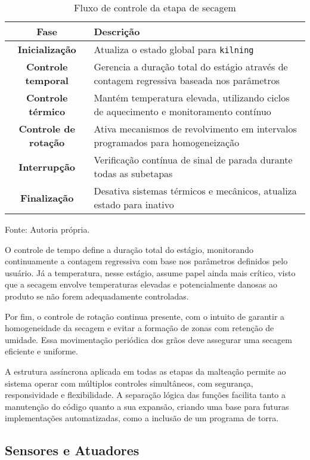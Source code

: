 \begin{table}[ht]
    \caption{Fluxo de controle da etapa de secagem}
    \label{tab:secagem_fluxo}
    \centering
    \begin{tabular}{>{\bfseries}c p{10cm}}
        \hline
        Fase & Descrição \\
        \hline
        Inicialização & Atualiza o estado global para \texttt{kilning} \\
        Controle temporal & Gerencia a duração total do estágio através de contagem regressiva baseada nos parâmetros \\
        Controle térmico & Mantém temperatura elevada, utilizando ciclos de aquecimento e monitoramento contínuo \\
        Controle de rotação & Ativa mecanismos de revolvimento em intervalos programados para homogeneização \\
        Interrupção & Verificação contínua de sinal de parada durante todas as subetapas \\
        Finalização & Desativa sistemas térmicos e mecânicos, atualiza estado para inativo \\
        \hline
    \end{tabular}

    {\centering\footnotesize Fonte: Autoria própria.\par}
\end{table}

O controle de tempo define a duração total do estágio, monitorando continuamente a contagem regressiva com base nos parâmetros definidos pelo usuário. Já a temperatura, nesse estágio, assume papel ainda mais crítico, visto que a secagem envolve temperaturas elevadas e potencialmente danosas ao produto se não forem adequadamente controladas.

Por fim, o controle de rotação continua presente, com o intuito de garantir a homogeneidade da secagem e evitar a formação de zonas com retenção de umidade. Essa movimentação periódica dos grãos deve assegurar uma secagem eficiente e uniforme.

A estrutura assíncrona aplicada em todas as etapas da malteação permite ao sistema operar com múltiplos controles simultâneos, com segurança, responsividade e flexibilidade. A separação lógica das funções facilita tanto a manutenção do código quanto a sua expansão, criando uma base para futuras implementações automatizadas, como a inclusão de um programa de torra.
 
\subsection{Sensores e Atuadores}


